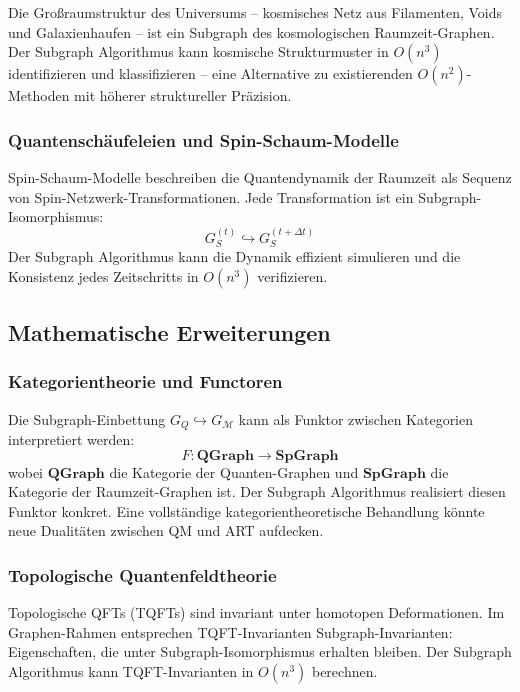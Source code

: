 ﻿\documentclass[a4paper,12pt]{article}
\theoremstyle{definition}
\begin{document}
Die Gro\ss{}raumstruktur des Universums -- kosmisches Netz aus
Filamenten, Voids und Galaxienhaufen -- ist ein Subgraph des
kosmologischen Raumzeit-Graphen. Der Subgraph Algorithmus kann
kosmische Strukturmuster in $O(n^3)$ identifizieren und
klassifizieren -- eine Alternative zu existierenden $O(n^2)$-Methoden
mit h\"oherer struktureller Pr\"azision.

\subsubsection{Quantensch\"aufeleien und Spin-Schaum-Modelle}

Spin-Schaum-Modelle \cite{perez2013} beschreiben die Quantendynamik
der Raumzeit als Sequenz von Spin-Netzwerk-Transformationen. Jede
Transformation ist ein Subgraph-Isomorphismus:
\[
G_S^{(t)} \hookrightarrow G_S^{(t+\Delta t)}
\]
Der Subgraph Algorithmus kann die Dynamik effizient simulieren
und die Konsistenz jedes Zeitschritts in $O(n^3)$ verifizieren.

\subsection{Mathematische Erweiterungen}

\subsubsection{Kategorientheorie und Functoren}

Die Subgraph-Einbettung $G_Q \hookrightarrow G_{\mathcal{M}}$ kann
als Funktor zwischen Kategorien interpretiert werden:
\[
F: \mathbf{QGraph} \to \mathbf{SpGraph}
\]
wobei $\mathbf{QGraph}$ die Kategorie der Quanten-Graphen und
$\mathbf{SpGraph}$ die Kategorie der Raumzeit-Graphen ist.
Der Subgraph Algorithmus realisiert diesen Funktor konkret.
Eine vollst\"andige kategorientheoretische Behandlung k\"onnte
neue Dualit\"aten zwischen QM und ART aufdecken.

\subsubsection{Topologische Quantenfeldtheorie}

Topologische QFTs (TQFTs) \cite{atiyah1988} sind invariant unter
homotopen Deformationen. Im Graphen-Rahmen entsprechen TQFT-Invarianten
Subgraph-Invarianten: Eigenschaften, die unter Subgraph-Isomorphismus
erhalten bleiben. Der Subgraph Algorithmus kann TQFT-Invarianten in
$O(n^3)$ berechnen.
\end{document}
